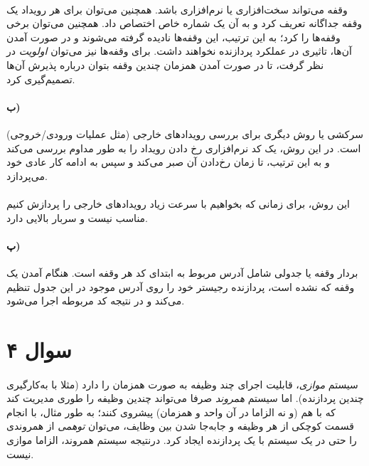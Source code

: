 \documentclass{article}
\begin{document}
	\paragraph*{}
	وقفه می‌تواند سخت‌افزاری یا نرم‌افزاری باشد. همچنین می‌توان برای هر رویداد یک وقفه جداگانه تعریف کرد و به آن یک شماره خاص اختصاص داد. همچنین می‌توان برخی وقفه‌ها را
	کرد؛ به این ترتیب، این وقفه‌ها نادیده گرفته می‌شوند و در صورت آمدن آن‌ها، تاثیری در عملکرد پردازنده نخواهند داشت. برای وقفه‌ها نیز می‌توان
	\textit{اولویت}
	در نظر گرفت، تا در صورت آمدن همزمان چندین وقفه بتوان درباره پذیرش آن‌ها تصمیم‌گیری کرد.

	\paragraph*{ب)}
	سرکشی یا
	روش دیگری برای بررسی رویدادهای خارجی (مثل عملیات ورودی/خروجی) است. در این روش، یک کد نرم‌افزاری رخ دادن رویداد را به طور مداوم بررسی می‌کند و به این ترتیب، تا زمان رخ‌دادن آن صبر می‌کند و سپس به ادامه کار عادی خود می‌پردازد.

	\paragraph*{}
	این روش، برای زمانی که بخواهیم با سرعت زیاد رویدادهای خارجی را پردازش کنیم مناسب نیست و سربار بالایی دارد.

	\paragraph*{پ)}
	بردار وقفه یا
	جدولی شامل آدرس مربوط به ابتدای کد
	هر وقفه است. هنگام آمدن یک وقفه که
	نشده است، پردازنده رجیستر
	خود را روی آدرس موجود در این جدول تنظیم می‌کند و در نتیجه کد
	مربوطه اجرا می‌شود.

	\section*{سوال ۴}
	\paragraph*{}
	سیستم
	\textit{موازی}،
	قابلیت اجرای چند وظیفه به صورت همزمان را دارد (مثلا با به‌کارگیری چندین پردازنده). اما سیستم
	\textit{همروند}
	صرفا می‌تواند چندین وظیفه را طوری مدیریت کند که با هم (و نه الزاما در آن واحد و همزمان) پیشروی کنند؛ به طور مثال، با انجام قسمت کوچکی از هر وظیفه و جابه‌جا شدن بین وظایف، می‌توان
	\textit{توهمی}
	از همروندی را حتی در یک سیستم با یک پردازنده ایجاد کرد. درنتیجه سیستم همروند، الزاما موازی نیست.
\end{document}
